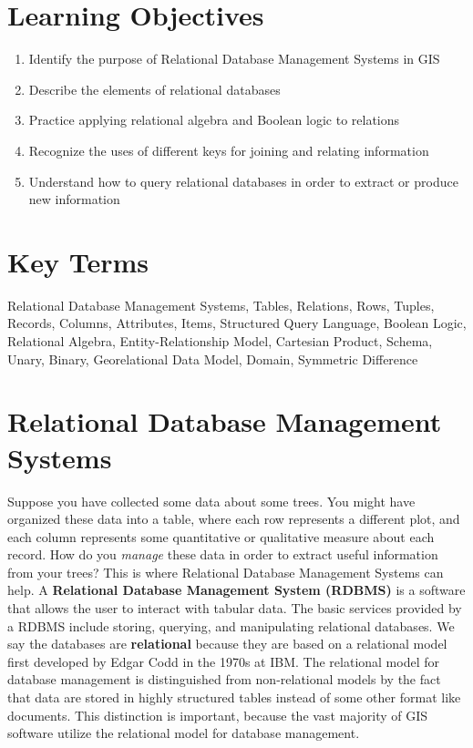 \documentclass[
]{book}
\providecommand{\tightlist}{%
  \setlength{\itemsep}{0pt}\setlength{\parskip}{0pt}}
\begin{document}
\hypertarget{learning-objectives-4}{%
\section*{Learning Objectives}\label{learning-objectives-4}}

\begin{enumerate}
\def\labelenumi{\arabic{enumi}.}
\tightlist
\item
  Identify the purpose of Relational Database Management Systems in GIS
\item
  Describe the elements of relational databases
\item
  Practice applying relational algebra and Boolean logic to relations
\item
  Recognize the uses of different keys for joining and relating information
\item
  Understand how to query relational databases in order to extract or produce new information
\end{enumerate}

\hypertarget{key-terms-4}{%
\section*{Key Terms}\label{key-terms-4}}

Relational Database Management Systems, Tables, Relations, Rows, Tuples, Records, Columns, Attributes, Items, Structured Query Language, Boolean Logic, Relational Algebra, Entity-Relationship Model, Cartesian Product, Schema, Unary, Binary, Georelational Data Model, Domain, Symmetric Difference

\hypertarget{relational-database-management-systems}{%
\section{Relational Database Management Systems}\label{relational-database-management-systems}}

Suppose you have collected some data about some trees. You might have organized these data into a table, where each row represents a different plot, and each column represents some quantitative or qualitative measure about each record. How do you \emph{manage} these data in order to extract useful information from your trees? This is where Relational Database Management Systems can help. A \textbf{Relational Database Management System (RDBMS)} is a software that allows the user to interact with tabular data. The basic services provided by a RDBMS include storing, querying, and manipulating relational databases. We say the databases are \textbf{relational} because they are based on a relational model first developed by Edgar Codd in the 1970s at IBM. The relational model for database management is distinguished from non-relational models by the fact that data are stored in highly structured tables instead of some other format like documents. This distinction is important, because the vast majority of GIS software utilize the relational model for database management.
\end{document}
